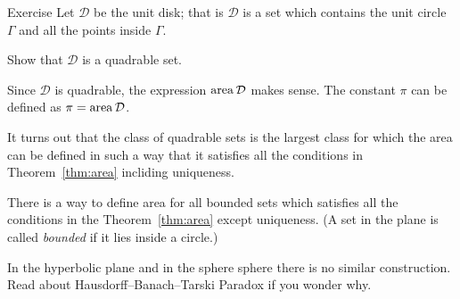 \begin{thm}{Exercise}\label{ex:circle-is-quadrable}
Let $\mathcal{D}$ be the unit disk;
that is $\mathcal{D}$ is a set which contains 
the unit circle $\Gamma$ and all the points inside $\Gamma$.

Show that $\mathcal{D}$ is a quadrable set.
\end{thm}

Since $\mathcal{D}$ is quadrable, 
the expression $\mathop{\rm area}\nolimits\mathcal{D}$ makes sense.
The constant $\pi$ can be defined as 
$\pi=\mathop{\rm area}\nolimits\mathcal{D}$.

\medskip

It turns out that the class of quadrable sets is the largest class for which 
the area can be defined in such a way that it satisfies all the conditions in Theorem~\ref{thm:area} incliding uniqueness.

There is a way to define area for all bounded sets
which satisfies all the conditions in the Theorem~\ref{thm:area} except uniqueness.
(A set in the plane is called \emph{bounded} if it lies inside a circle.)

In the hyperbolic plane and in the sphere sphere
there is no similar construction.
Read about Hausdorff--Banach--Tarski Paradox
if you wonder why.


